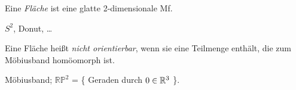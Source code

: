 \begin{defi}[Fläche]
Eine \emph{Fläche} ist eine glatte 2-dimensionale Mf.
\end{defi}

\begin{bsp}
$S^2$, Donut, \dots
\end{bsp}

\begin{defi}[Orientierbarkeit]
Eine Fläche heißt \emph{nicht orientierbar}, wenn sie eine Teilmenge enthält, die zum Möbiusband homöomorph ist.
\end{defi}

\begin{bsp}
Möbiusband; $\mathbb{RP}^2$ = \{ Geraden durch $0 \in \mathbb R^3$ \}.
\end{bsp}